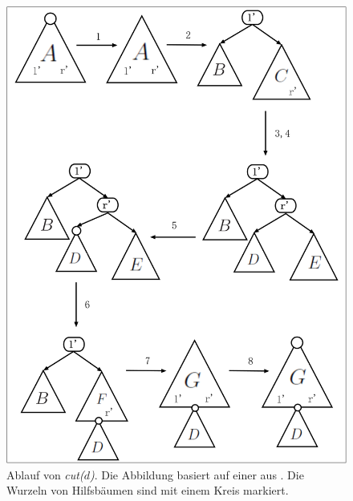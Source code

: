 \documentclass[a4paper,12pt]{article}
\begin{document}
\begin{figure}[H]
	\centering
	\includegraphics[width=1\textwidth]{Medien/Tango/cut}
	\caption{Ablauf von \textit{cut($d$)}. Die Abbildung basiert auf einer aus \cite{demainDinamicOpti}. Die Wurzeln von Hilfsbäumen sind mit einem Kreis markiert. }
	\label{fig:cut}
\end{figure}
\end{document}
